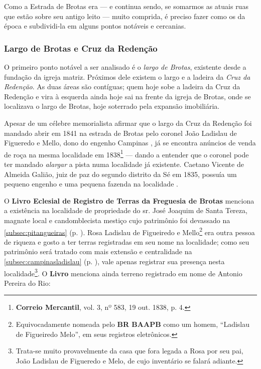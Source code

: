 Como a Estrada de Brotas era --- e continua sendo, se somarmos as atuais ruas que estão sobre seu antigo leito --- muito comprida, é preciso fazer como os da época e subdividi-la em alguns pontos notáveis e cercanias.

\subsubsection{Largo de Brotas e Cruz da Redenção}\label{subsubsec:brotasredencao}

O primeiro ponto notável a ser analisado é o \textit{largo de Brotas}, existente desde a fundação da igreja matriz. Próximos dele existem o largo e a ladeira da \textit{Cruz da Redenção}. As duas áreas são contíguas; quem hoje sobe a ladeira da Cruz da Redenção e vira à esquerda ainda hoje sai na frente da igreja de Brotas, onde se localizava o largo de Brotas, hoje soterrado pela expansão imobiliária.

Apesar de um célebre memorialista afirmar que o largo da Cruz da Redenção foi mandado abrir em 1841 na estrada de Brotas pelo coronel João Ladislau de Figueredo e Mello, dono do engenho Campinas \cite[p.~88]{campos_brotas_1942}, já se encontra anúncios de venda de roça na mesma localidade em 1838\footnote{\textbf{Correio Mercantil}, vol. 3, nº 583, 19 out. 1838, p. 4.} --- dando a entender que o coronel pode ter mandado \textit{alargar} a pista numa localidade já existente. Caetano Vicente de Almeida Galião, juiz de paz do segundo distrito da Sé em 1835, possuía um pequeno engenho e uma pequena fazenda na localidade \cite[p.~239]{REIS2004males}.

O \textbf{Livro Eclesial de Registro de Terras da Freguesia de Brotas} menciona a existência na localidade de propriedade do sr. José Joaquim de Santa Tereza, magnate local e candomblecista mestiço cujo patrimônio foi devassado na \autoref{subsec:pitangueiras} (p. \pageref{subsec:pitangueiras}). Rosa Ladislau de Figueiredo e Mello\footnote{Equivocadamente nomeada pelo \textbf{BR BAAPB} como um homem, ``Ladislau de Figueiredo Melo'', em seus registros eletrônicos.} era outra pessoa de riqueza e gosto a ter terras registradas em seu nome na localidade; como seu patrimônio será tratado com mais extensão e centralidade na \autoref{subsec:campinasladislau} (p. \pageref{subsec:campinasladislau}), vale apenas registrar sua presença nesta localidade\footnote{Trata-se muito provavelmente da casa que fora legada a Rosa por seu pai, João Ladislau de Figueredo e Melo, de cujo inventário se falará adiante.}. O \textbf{Livro} menciona ainda terreno registrado em nome de Antonio Pereira do Rio:

